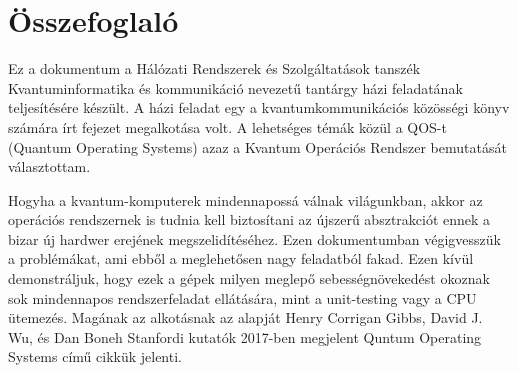 \chapter*{Összefoglaló}

\hspace{2mm} Ez a dokumentum a Hálózati Rendszerek és Szolgáltatások tanszék Kvantuminformatika és kommunikáció nevezetű tantárgy házi feladatának teljesítésére készült.
A házi feladat egy a kvantumkommunikációs közösségi könyv számára írt fejezet megalkotása volt.
A lehetséges témák közül a QOS-t (Quantum Operating Systems) azaz a Kvantum Operációs Rendszer bemutatását választottam.

\indent Hogyha a kvantum-komputerek mindennapossá válnak világunkban, akkor az operációs rendszernek is tudnia kell biztosítani az újszerű absztrakciót ennek a bizar új hardwer erejének megszelidítéséhez.
Ezen dokumentumban végigvesszük a problémákat, ami ebből a meglehetősen nagy feladatból fakad.
Ezen kívül demonstráljuk, hogy ezek a gépek milyen meglepő sebességnövekedést okoznak sok mindennapos rendszerfeladat ellátására, mint a unit-testing vagy a CPU ütemezés.
Magának az alkotásnak az alapját Henry Corrigan Gibbs, David J. Wu, és Dan Boneh Stanfordi kutatók 2017-ben megjelent Quntum Operating Systems című cikkük jelenti.